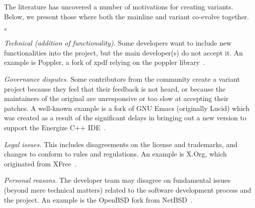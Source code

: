 The literature has uncovered a number of motivations for creating variants. Below, we present those where both the mainline and variant co-evolve together.%


\begin{list}{$\circ$}{}
   \item \textit{Technical (addition of functionality).} Some developers want to include new functionalities into the project, but the main developer(s) do not accept it. An example is \textsf{Poppler}, a fork of \textsf{xpdf} relying on the \textsf{poppler} library~\cite{Gregorio:2012}.

    \item \textit{Governance disputes.} Some contributors from the community create a variant project because they feel that their feedback is not heard, or because the maintainers of the original are unresponsive or too slow at accepting their patches. A well-known example is a fork of \textsf{GNU Emacs} (originally \textsf{Lucid}) which was created as a result of the significant delays in bringing out a new version to support the Energize C++ IDE~\cite{Wheeler:2015Forking}.

\item \textit{Legal issues.} This includes disagreements on the license and trademarks, and changes to conform to rules and regulations. An example is \textsf{X.Org}, which originated from \textsf{XFree}~\cite{Gregorio:2012,Wheeler:2015Forking}.

\item \textit{Personal reasons.} The developer team may disagree on fundamental issues (beyond mere technical matters) related to the software development process and the project. An example is the \textsf{OpenBSD} fork from \textsf{NetBSD}~\cite{Gregorio:2012}.


\end{list}

